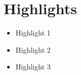 

\section*{Highlights}
\begin{itemize}
    \item Highlight 1
    \item Highlight 2
    \item Highlight 3
\end{itemize}